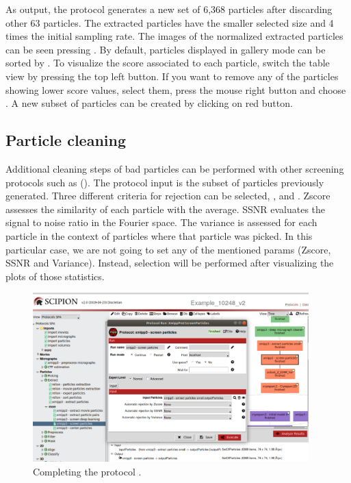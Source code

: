   As output, the protocol generates a new set of 6,368 particles after discarding other 63 particles. The extracted particles have the smaller selected size and 4 times the initial sampling rate. The images of the normalized extracted particles can be seen pressing . By default, particles displayed in gallery mode can be sorted by . To visualize the score associated to each particle, switch the table view by pressing the top left button. If you want to remove any of the particles showing lower score values, select them, press the mouse right button and choose . A new subset of particles can be created by clicking on  red button. 
  
  \subsection*{Particle cleaning}
  
  Additional cleaning steps of bad particles can be performed with other screening protocols such as  (). The protocol input is the subset of particles previously generated. Three different criteria for rejection can be selected, ,  and . Zscore assesses the similarity of each particle with the average. SSNR evaluates the signal to noise ratio in the Fourier space. The variance is assessed for each particle in the context of particles where that particle was picked. In this particular case, we are not going to set any of the mentioned params (Zscore, SSNR and Variance). Instead, selection will be performed after visualizing the plots of those statistics. 
  
  \begin{figure}[H]
  \centering
  \captionsetup{width=.8\linewidth} 
  \includegraphics[width=0.95\textwidth]
  {images/xmipp_screen_particles.pdf}
  \caption{Completing the protocol .}
  \label{fig:xmipp_screen_particles}
  \end{figure}
  
